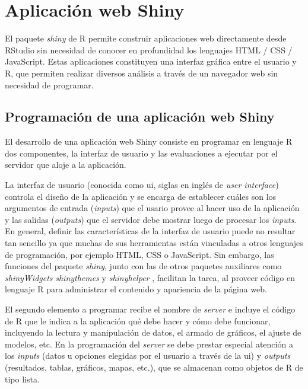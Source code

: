 \section{Aplicación web Shiny}

El paquete \emph{shiny} \citep{Changetal2020} de R permite construir aplicaciones web directamente desde RStudio sin necesidad de conocer en profundidad los lenguajes HTML / CSS / JavaScript. Estas aplicaciones constituyen una interfaz gráfica entre el usuario y R, que permiten realizar diversos análisis a través de un navegador web sin necesidad de programar.


\subsection{Programación de una aplicación web Shiny}

El desarrollo de una aplicación web Shiny consiste en programar en lenguaje R dos componentes, la interfaz de usuario y las evaluaciones a ejecutar por el servidor que aloje a la aplicación.

La interfaz de usuario (conocida como ui, siglas en inglés de \emph{user interface}) controla el diseño de la aplicación y se encarga de establecer cuáles son los argumentos de entrada (\emph{inputs}) que el usario provee al hacer uso de la aplicación y las salidas (\emph{outputs}) que el servidor debe mostrar luego de procesar los \emph{inputs}. En general, definir las características de la interfaz de usuario puede no resultar tan sencillo ya que muchas de sus herramientas están vinculadas a otros lenguajes de programación, por ejemplo HTML, CSS o JavaScript. Sin embargo, las funciones del paquete \emph{shiny}, junto con las de otros paquetes auxiliares como \emph{shinyWidgets} \citep{Perrieretal2020} \emph{shinythemes} \citep{Chang2018} y \emph{shinyhelper} \citep{Mason2019}, facilitan la tarea, al proveer código en lenguaje R para administrar el contenido y apariencia de la página web.

El segundo elemento a programar recibe el nombre de \emph{server} e incluye el código de R que le indica a la aplicación qué debe hacer y cómo debe funcionar, incluyendo la lectura y manipulación de datos, el armado de gráficos, el ajuste de modelos, etc. En la programación del \emph{server} se debe prestar especial atención a los \emph{inputs} (datos u opciones elegidas por el usuario a través de la ui) y \emph{outputs} (resultados, tablas, gráficos, mapas, etc.), que se almacenan como objetos de R de tipo lista.

